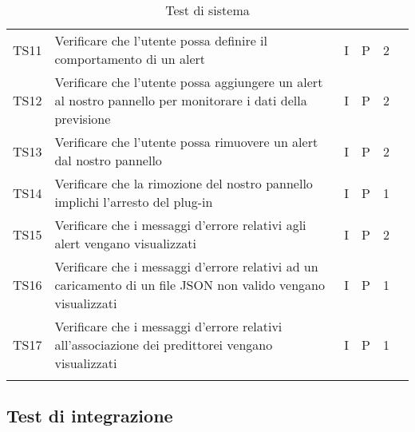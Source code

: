 \begin{longtable} {
	>{}p{12mm}
	>{}p{79.5mm}
	>{}p{9mm}
	>{}p{8mm}
	>{}p{14mm}
	>{}p{0mm}}
	TS11 & Verificare che l'utente possa definire il comportamento di un alert & I & P & 2 & \TBstrut \\ [2mm]
	TS12 & Verificare che l'utente possa aggiungere un alert al nostro pannello per monitorare i dati della previsione & I & P & 2 & \TBstrut \\ [2mm]
	TS13 & Verificare che l'utente possa rimuovere un alert dal nostro pannello & I & P & 2 & \TBstrut \\ [2mm]
	TS14 & Verificare che la rimozione del nostro pannello implichi l'arresto del plug-in & I & P & 1 & \TBstrut \\ [2mm]
	TS15 & Verificare che i messaggi d'errore relativi agli alert vengano visualizzati & I & P & 2 & \TBstrut \\ [2mm]
	TS16 & Verificare che i messaggi d'errore relativi ad un caricamento di un file JSON non valido vengano visualizzati & I & P & 1 & \TBstrut \\ [2mm]
	TS17 & Verificare che i messaggi d'errore relativi all'associazione dei predittorei vengano visualizzati & I & P & 1 & \TBstrut \\ [2mm]
	\rowcolor{white}
	\caption{Test di sistema}
\end{longtable}


\subsection{Test di integrazione}

